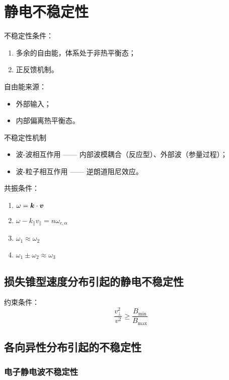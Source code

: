 
\chapter{静电不稳定性}

不稳定性条件：
\begin{enumerate}
    \item 多余的自由能，体系处于非热平衡态；
    \item 正反馈机制。
\end{enumerate}

自由能来源：
\begin{itemize}
    \item 外部输入；
    \item 内部偏离热平衡态。
\end{itemize}

不稳定性机制
\begin{itemize}
    \item 波-波相互作用 —— 内部波模耦合（反应型）、外部波（参量过程）；
    \item 波-粒子相互作用 —— 逆朗道阻尼效应。
\end{itemize}

共振条件：
\begin{enumerate}
    \item $\omega = \bm{k}\cdot\bm{v}$
    \item $\omega - k_\parallel v_\parallel = n \omega_{c,\alpha}$
    \item $\omega_1 \approx \omega_2$
    \item $\omega_1 \pm \omega_2 \approx \omega_3$
\end{enumerate}

\section{损失锥型速度分布引起的静电不稳定性}

约束条件：
\begin{equation}
\frac{v_\perp^2}{v^2} \geq \frac{B_{\min}}{B_{\max}}
\end{equation}

\section{各向异性分布引起的不稳定性}

\subsection{电子静电波不稳定性}

